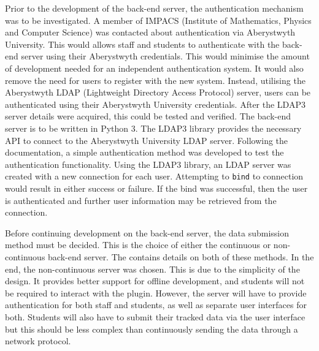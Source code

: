 Prior to the development of the back-end server, the authentication mechanism was to be investigated. A member of IMPACS (Institute of Mathematics, Physics and Computer Science) was contacted about authentication via Aberystwyth University. This would allows staff and students to authenticate with the back-end server using their Aberystwyth credentials. This would minimise the amount of development needed for an independent authentication system. It would also remove the need for users to register with the new system. Instead, utilising the Aberystwyth LDAP (Lightweight Directory Access Protocol) server, users can be authenticated using their Aberystwyth University credentials. After the LDAP3 server details were acquired, this could be tested and verified. The back-end server is to be written in Python 3. The LDAP3 library provides the necessary API to connect to the Aberystwyth University LDAP server\cite{LDAP3Docs}. Following the documentation, a simple authentication method was developed to test the authentication functionality. Using the LDAP3 library, an LDAP server was created with a new connection for each user. Attempting to \texttt{bind} to connection would result in either success or failure. If the bind was successful, then the user is authenticated and further user information may be retrieved from the connection.

Before continuing development on the back-end server, the data submission method must be decided. This is the choice of either the continuous or non-continuous back-end server. The  contains details on both of these methods. In the end, the non-continuous server was chosen. This is due to the simplicity of the design. It provides better support for offline development, and students will not be required to interact with the plugin. However, the server will have to provide authentication for both staff and students, as well as separate user interfaces for both. Students will also have to submit their tracked data via the user interface but this should be less complex than continuously sending the data through a network protocol.

